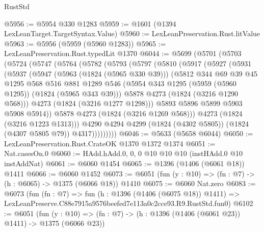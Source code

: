 \begin{lexlean}{RustStd}
\begin{coremodule}
@5956 := @5954 @330 @1283
@5959 := @1601 (@1394 LexLeanTarget.TargetSyntax.Value)
@5960 := LexLeanPreservation.Rust.litValue
@5963 := @5956 (@5959 (@5960 @1283))
@5965 := LexLeanPreservation.Rust.typedLit @1370
@6044 := @5699
    (@5701
      (@5703
        (@5724
          (@5747
            (@5764
              (@5782
                (@5793
                  (@5797
                    (@5810
                      (@5917
                        (@5927
                          (@5931
                            (@5937
                              (@5947
                                (@5963 (@1824 (@5965 @330 @39)))
                                (@5812
                                  @344
                                  @69
                                  @39
                                  @45
                                  @1295
                                  @568
                                  @516
                                  @881
                                  @1289
                                  @546
                                  (@5954 @343 @1295 (@5959 (@5960 @1295)) (@1824 (@5965 @343 @39)))
                                  @5878
                                  @4273
                                  (@1824 (@3216 @1290 @568)))
                                @4273
                                (@1824 (@3216 @1277 @1298)))
                              @5893
                              @5896
                              @5899
                              @5903
                              @5908
                              @5914))
                          @5878
                          @4273
                          (@1824 (@3216 @1269 @568)))
                        @4273
                        (@1824 (@3216 @1223 @1313)))
                      @4290
                      @4294
                      @4299
                      (@1824 (@4302 @5805))
                      (@1824 (@4307 @5805 @79))
                      @4317)))))))))
@6046 := @5633 (@5658 @6044)
@6050 := LexLeanPreservation.Rust.CrateOK @1370 @1372 @1374
@6051 := Nat.casesOn.{0}
@6060 := HAdd.hAdd.{0, 0, 0} @10 @10 @10 (instHAdd.{0} @10 instAddNat)
@6061 := @6060 @1454
@6065 := @1396 (@1406 (@6061 @18)) @1411
@6066 := @6060 @1452
@6073 := @6051 (fun (y : @10) => (fn : @7) -> (h : @6065) -> @1375 (@6066 @18)) @1410
@6075 := @6060 Nat.zero
@6083 := @6073
    (fun (fn : @7) =>
    fun (h : @1396 (@1406 (@6075 @18)) @1411) =>
    LexLeanPreserve.C88e7915a9576beefed7e113a0c2cce93.R9.RustStd.fun0)
@6102 := @6051
    (fun (y : @10) => (fn : @7) -> (h : @1396 (@1406 (@6061 @23)) @1411) -> @1375 (@6066 @23))

\end{coremodule}
\end{lexlean}
